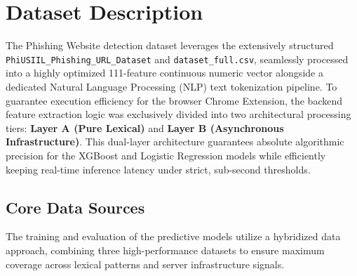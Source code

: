 \section{Dataset Description}

The Phishing Website detection dataset leverages the extensively structured \\ \texttt{PhiUSIIL\_Phishing\_URL\_Dataset} \cite{ref5} and \texttt{dataset\_full.csv}, seamlessly processed into a highly optimized 111-feature continuous numeric vector alongside a dedicated Natural Language Processing (NLP) text tokenization pipeline. To guarantee execution efficiency for the browser Chrome Extension, the backend feature extraction logic was exclusively divided into two architectural processing tiers: \textbf{Layer A (Pure Lexical)} and \textbf{Layer B (Asynchronous Infrastructure)}. This dual-layer architecture guarantees absolute algorithmic precision for the XGBoost and Logistic Regression models while efficiently keeping real-time inference latency under strict, sub-second thresholds.

\subsection{Core Data Sources}
The training and evaluation of the predictive models utilize a hybridized data approach, combining three high-performance datasets to ensure maximum coverage across lexical patterns and server infrastructure signals.

